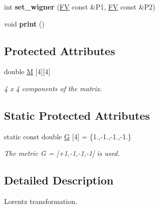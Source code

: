 \begin{DoxyCompactItemize}
\item 
\hypertarget{classLT_a5a8d17a0e9374ba9cef862c1f98a5d62}{}int {\bfseries set\+\_\+wigner} (\hyperlink{classFV}{F\+V} const \&P1, \hyperlink{classFV}{F\+V} const \&P2)\label{classLT_a5a8d17a0e9374ba9cef862c1f98a5d62}

\item 
\hypertarget{classLT_a6687d255d8543565e26ae9bc37b4a414}{}void {\bfseries print} ()\label{classLT_a6687d255d8543565e26ae9bc37b4a414}

\end{DoxyCompactItemize}
\subsection*{Protected Attributes}
\begin{DoxyCompactItemize}
\item 
\hypertarget{classLT_adfe83a60779798fcb358f2fb12d79cda}{}double \hyperlink{classLT_adfe83a60779798fcb358f2fb12d79cda}{M} \mbox{[}4\mbox{]}\mbox{[}4\mbox{]}\label{classLT_adfe83a60779798fcb358f2fb12d79cda}

\begin{DoxyCompactList}\small\item\em 4 x 4 components of the matrix. \end{DoxyCompactList}\end{DoxyCompactItemize}
\subsection*{Static Protected Attributes}
\begin{DoxyCompactItemize}
\item 
\hypertarget{classLT_a3ec591d3e26134d35eb127d0610c7866}{}static const double \hyperlink{classLT_a3ec591d3e26134d35eb127d0610c7866}{G} \mbox{[}4\mbox{]} = \{1.,-\/1.,-\/1.,-\/1.\}\label{classLT_a3ec591d3e26134d35eb127d0610c7866}

\begin{DoxyCompactList}\small\item\em The metric G = \mbox{[}+1,-\/1,-\/1,-\/1\mbox{]} is used. \end{DoxyCompactList}\end{DoxyCompactItemize}


\subsection{Detailed Description}
Lorentz transformation. 

